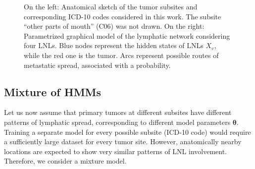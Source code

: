 \documentclass[11pt,twocolumn,twoside]{article}
\begin{document}
\begin{figure}[th]


\caption{\label{fig-schematic-and-graph}On the left: Anatomical sketch
of the tumor subsites and corresponding ICD-10 codes considered in this
work. The subsite ``other parts of mouth'' (C06) was not drawn. On the
right: Parametrized graphical model of the lymphatic network considering
four LNLs. Blue nodes represent the hidden states of LNLs \(X_v\), while
the red one is the tumor. Arcs represent possible routes of metastatic
spread, associated with a probability.}

\end{figure}%

\subsection{Mixture of HMMs}\label{sec-mixture-of-hmms}

Let us now assume that primary tumors at different subsites have
different patterns of lymphatic spread, corresponding to different model
parameters \(\boldsymbol{\theta}\). Training a separate model for every
possible subsite (ICD-10 code) would require a sufficiently large
dataset for every tumor site. However, anatomically nearby locations are
expected to show very similar patterns of LNL involvement. Therefore, we
consider a mixture model.
\end{document}
